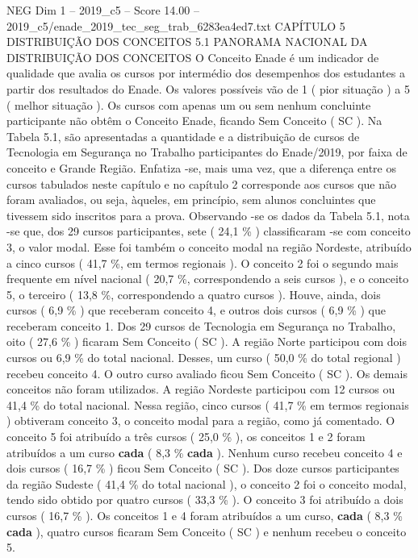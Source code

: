 \begin{textsample}{NEG Dim 1 – 2019\_c5 – Score 14.00 – 2019\_c5/enade\_2019\_tec\_seg\_trab\_6283ea4ed7.txt}  \label{ex:f1_neg_391}
CAPÍTULO 5 DISTRIBUIÇÃO DOS CONCEITOS 5.1 PANORAMA NACIONAL DA DISTRIBUIÇÃO DOS CONCEITOS O Conceito Enade é um indicador de qualidade que avalia os cursos por intermédio dos desempenhos dos estudantes a partir dos resultados do Enade.
Os valores possíveis vão de 1 ( pior situação ) a 5 ( melhor situação ).
Os cursos com apenas um ou sem nenhum concluinte participante não obtêm o Conceito Enade, ficando Sem Conceito ( SC ).
Na Tabela 5.1, são apresentadas a quantidade e a distribuição de cursos de Tecnologia em Segurança no Trabalho participantes do Enade/2019, por faixa de conceito e Grande Região.
Enfatiza -se, mais uma vez, que a diferença entre os cursos tabulados neste capítulo e no capítulo 2 corresponde aos cursos que não foram avaliados, ou seja, àqueles, em princípio, sem alunos concluintes que tivessem sido inscritos para a prova.
Observando -se os dados da Tabela 5.1, nota -se que, dos 29 cursos participantes, sete ( 24,1 \% ) classificaram -se com conceito 3, o valor modal.
Esse foi também o conceito modal na região Nordeste, atribuído a cinco cursos ( 41,7 \%, em termos regionais ).
O conceito 2 foi o segundo mais frequente em nível nacional ( 20,7 \%, correspondendo a seis cursos ), e o conceito 5, o terceiro ( 13,8 \%, correspondendo a quatro cursos ).
Houve, ainda, dois cursos ( 6,9 \% ) que receberam conceito 4, e outros dois cursos ( 6,9 \% ) que receberam conceito 1.
Dos 29 cursos de Tecnologia em Segurança no Trabalho, oito ( 27,6 \% ) ficaram Sem Conceito ( SC ).
A região Norte participou com dois cursos ou 6,9 \% do total nacional.
Desses, um curso ( 50,0 \% do total regional ) recebeu conceito 4.
O outro curso avaliado ficou Sem Conceito ( SC ).
Os demais conceitos não foram utilizados.
A região Nordeste participou com 12 cursos ou 41,4 \% do total nacional.
Nessa região, cinco cursos ( 41,7 \% em termos regionais ) obtiveram conceito 3, o conceito modal para a região, como já comentado.
O conceito 5 foi atribuído a três cursos ( 25,0 \% ), os conceitos 1 e 2 foram atribuídos a um curso \textbf{cada} ( 8,3 \% \textbf{cada} ).
Nenhum curso recebeu conceito 4 e dois cursos ( 16,7 \% ) ficou Sem Conceito ( SC ).
Dos doze cursos participantes da região Sudeste ( 41,4 \% do total nacional ), o conceito 2 foi o conceito modal, tendo sido obtido por quatro cursos ( 33,3 \% ).
O conceito 3 foi atribuído a dois cursos ( 16,7 \% ).
Os conceitos 1 e 4 foram atribuídos a um curso, \textbf{cada} ( 8,3 \% \textbf{cada} ), quatro cursos ficaram Sem Conceito ( SC ) e nenhum recebeu o conceito 5.

\end{textsample}
